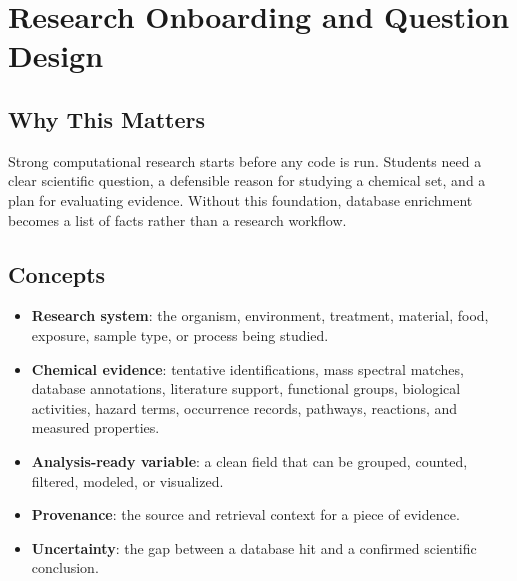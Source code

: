 \chapter{Research Onboarding and Question Design}


\section{Why This Matters}
Strong computational research starts before any code is run. Students need a clear scientific question, a defensible reason for studying a chemical set, and a plan for evaluating evidence. Without this foundation, database enrichment becomes a list of facts rather than a research workflow.

\section{Concepts}
\begin{itemize}
  \item \textbf{Research system}: the organism, environment, treatment, material, food, exposure, sample type, or process being studied.
  \item \textbf{Chemical evidence}: tentative identifications, mass spectral matches, database annotations, literature support, functional groups, biological activities, hazard terms, occurrence records, pathways, reactions, and measured properties.
  \item \textbf{Analysis-ready variable}: a clean field that can be grouped, counted, filtered, modeled, or visualized.
  \item \textbf{Provenance}: the source and retrieval context for a piece of evidence.
  \item \textbf{Uncertainty}: the gap between a database hit and a confirmed scientific conclusion.
\end{itemize}

